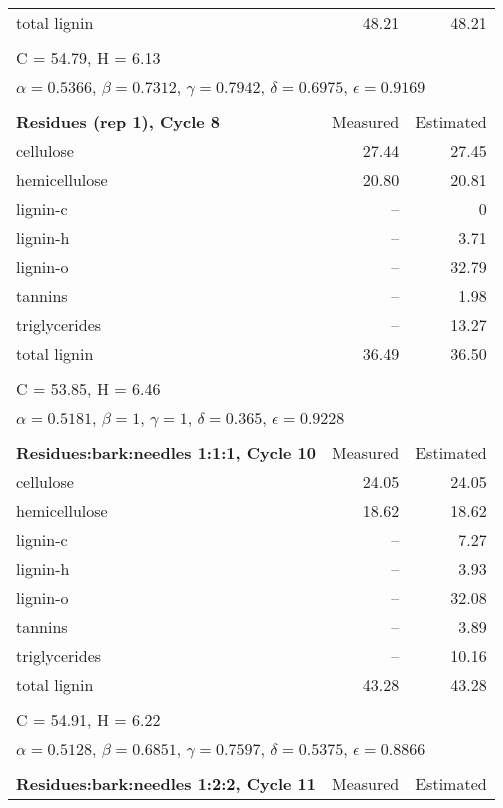 \begin{longtable}{p{8cm}rr}
    total lignin  & 48.21 & 48.21 \\
    \\
    \multicolumn{3}{l}{C = 54.79, H = 6.13} \\
    \multicolumn{3}{l}{$\alpha = 0.5366$, $\beta = 0.7312$, $\gamma = 0.7942$, $\delta = 0.6975$, $\epsilon = 0.9169$} \\
    \\
    \textbf{Residues (rep 1), Cycle 8} & Measured & Estimated \\
    \midrule
    cellulose     & 27.44 & 27.45 \\
    hemicellulose & 20.80 & 20.81 \\
    lignin-c      & --    & 0 \\
    lignin-h      & --    & 3.71 \\
    lignin-o      & --    & 32.79 \\
    tannins       & --    & 1.98 \\
    triglycerides & --    & 13.27 \\
    total lignin  & 36.49 & 36.50 \\
    \\
    \multicolumn{3}{l}{C = 53.85, H = 6.46} \\
    \multicolumn{3}{l}{$\alpha = 0.5181$, $\beta = 1$, $\gamma = 1$, $\delta = 0.365$, $\epsilon = 0.9228$} \\
    \\
    \textbf{Residues:bark:needles 1:1:1, Cycle 10} & Measured & Estimated \\
    \midrule
    cellulose     & 24.05 & 24.05 \\
    hemicellulose & 18.62 & 18.62 \\
    lignin-c      & --    & 7.27 \\
    lignin-h      & --    & 3.93 \\
    lignin-o      & --    & 32.08 \\
    tannins       & --    & 3.89 \\
    triglycerides & --    & 10.16 \\
    total lignin  & 43.28 & 43.28 \\
    \\
    \multicolumn{3}{l}{C = 54.91, H = 6.22} \\
    \multicolumn{3}{l}{$\alpha = 0.5128$, $\beta = 0.6851$, $\gamma = 0.7597$, $\delta = 0.5375$, $\epsilon = 0.8866$} \\
    \\
    \textbf{Residues:bark:needles 1:2:2, Cycle 11} & Measured & Estimated \\

\end{longtable}
